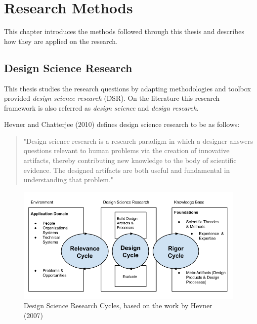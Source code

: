 
\chapter{Research Methods}

This chapter introduces the methods followed through this thesis and describes how they are applied on the research.





\section{Design Science Research}


This thesis studies the research questions by adapting methodologies and toolbox provided \textit{design science research} (DSR). On the literature this research framework is also referred as \textit{design science} and \textit{design research}.

Hevner and Chatterjee (2010) defines design science research to be as follows: %
\begin{quote}
	"Design science research is a research paradigm in which a designer answers questions relevant to human problems via the creation of innovative artifacts, thereby contributing new knowledge to the body of scientific evidence. The designed artifacts are both useful and fundamental in understanding that problem."
\end{quote}

\begin{figure}
\begin{center}
\includegraphics[width=1\textwidth]{assets/dsrcycles.png}
\end{center}
\caption{Design Science Research Cycles, based on the work by Hevner (2007)}
\label{fig:dsrcycles}
\end{figure}


